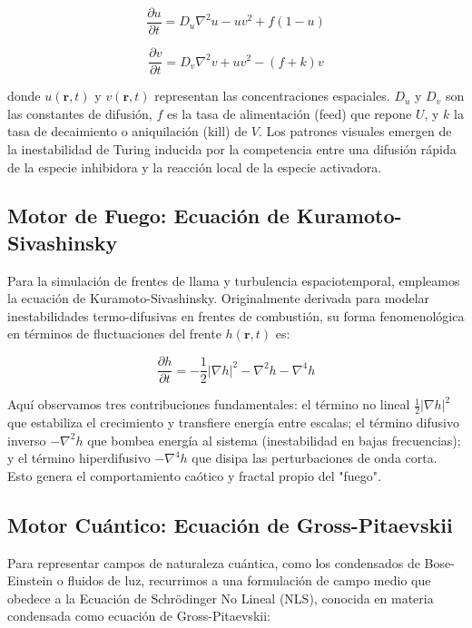 \documentclass[12pt]{book}
\begin{document}
\begin{equation}
\frac{\partial u}{\partial t} = D_u \nabla^2 u - u v^2 + f(1 - u)
\end{equation}

\begin{equation}
\frac{\partial v}{\partial t} = D_v \nabla^2 v + u v^2 - (f + k)v
\end{equation}

donde $u(\mathbf{r},t)$ y $v(\mathbf{r},t)$ representan las concentraciones espaciales. $D_u$ y $D_v$ son las constantes de difusión, $f$ es la tasa de alimentación (feed) que repone $U$, y $k$ la tasa de decaimiento o aniquilación (kill) de $V$. Los patrones visuales emergen de la inestabilidad de Turing inducida por la competencia entre una difusión rápida de la especie inhibidora y la reacción local de la especie activadora.

\subsection{Motor de Fuego: Ecuación de Kuramoto-Sivashinsky}
Para la simulación de frentes de llama y turbulencia espaciotemporal, empleamos la ecuación de Kuramoto-Sivashinsky. Originalmente derivada para modelar inestabilidades termo-difusivas en frentes de combustión, su forma fenomenológica en términos de fluctuaciones del frente $h(\mathbf{r},t)$ es:

\begin{equation}
\frac{\partial h}{\partial t} = -\frac{1}{2} |\nabla h|^2 - \nabla^2 h - \nabla^4 h
\end{equation}

Aquí observamos tres contribuciones fundamentales: el término no lineal $\frac{1}{2} |\nabla h|^2$ que estabiliza el crecimiento y transfiere energía entre escalas; el término difusivo inverso $-\nabla^2 h$ que bombea energía al sistema (inestabilidad en bajas frecuencias); y el término hiperdifusivo $-\nabla^4 h$ que disipa las perturbaciones de onda corta. Esto genera el comportamiento caótico y fractal propio del "fuego".

\subsection{Motor Cuántico: Ecuación de Gross-Pitaevskii}
Para representar campos de naturaleza cuántica, como los condensados de Bose-Einstein o fluidos de luz, recurrimos a una formulación de campo medio que obedece a la Ecuación de Schrödinger No Lineal (NLS), conocida en materia condensada como ecuación de Gross-Pitaevskii:
\end{document}
